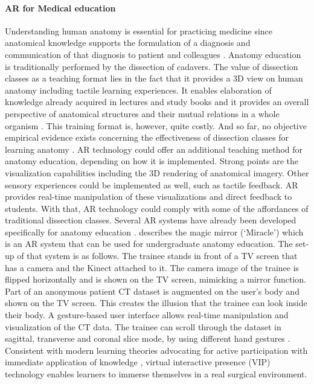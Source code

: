 \paragraph{AR for Medical education}
Understanding human anatomy is essential for practicing medicine since anatomical knowledge supports the formulation of a diagnosis and communication of that diagnosis to patient and colleagues \cite{Frank2005}. 
Anatomy education is traditionally performed by the dissection of cadavers.  The value of dissection classes as a teaching format lies in the fact that it provides a 3D view on human anatomy including tactile learning experiences. It enables elaboration of knowledge already acquired in lectures and study books and it provides an overall perspective of anatomical structures and their mutual relations in a whole organism \cite{McLachlan2004}. 
This training format is, however, quite costly. And so far, no objective empirical evidence exists concerning the effectiveness of dissection classes for learning anatomy \cite{Frank2005}. 
AR technology could offer an additional teaching method for anatomy education, depending on how it is implemented. Strong points are the visualization capabilities including the 3D rendering of anatomical imagery. Other sensory experiences could be implemented as well, such as tactile feedback. AR provides real-time manipulation of these visualizations and direct feedback to students. With that, AR technology could comply with some of the affordances of traditional dissection classes. Several AR systems have already been developed specifically for anatomy education \cite{Thomas2010,Chien2010,Blum2012b}. 
\citet{Blum2012b} describes the magic mirror (`Miracle') which is an AR system that can be used for undergraduate anatomy education. The set-up of that system is as follows. The trainee stands in front of a TV screen that has a camera and the Kinect attached to it. The camera image of the trainee is flipped horizontally and is shown on the TV screen, mimicking a mirror function. Part of an anonymous patient CT dataset is augmented on the user's body and shown on the TV screen. This creates the illusion that the trainee can look inside their body. 
A gesture-based user interface allows real-time manipulation and visualization of the CT data. The trainee can scroll through the dataset in sagittal, transverse and coronal slice mode, by using different hand gestures \cite{Kamphuis2014}.
Consistent with modern learning theories advocating for active participation with immediate application of knowledge \cite{Ponce2014}, virtual interactive presence (VIP) technology enables learners to immerse themselves in a real surgical environment. 
